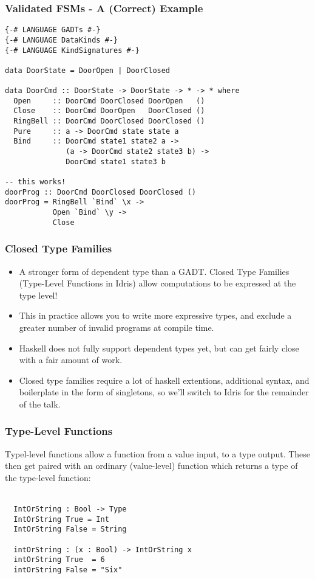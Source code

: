 \documentclass{beamer}
\begin{document}
\begin{frame}[fragile, shrink=10]
\frametitle{Validated FSMs - A (Correct) Example}
\begin{verbatim}
{-# LANGUAGE GADTs #-}
{-# LANGUAGE DataKinds #-}
{-# LANGUAGE KindSignatures #-}

data DoorState = DoorOpen | DoorClosed

data DoorCmd :: DoorState -> DoorState -> * -> * where
  Open     :: DoorCmd DoorClosed DoorOpen   ()  
  Close    :: DoorCmd DoorOpen   DoorClosed ()
  RingBell :: DoorCmd DoorClosed DoorClosed ()
  Pure     :: a -> DoorCmd state state a
  Bind     :: DoorCmd state1 state2 a -> 
              (a -> DoorCmd state2 state3 b) ->
              DoorCmd state1 state3 b

-- this works!
doorProg :: DoorCmd DoorClosed DoorClosed ()
doorProg = RingBell `Bind` \x ->  
           Open `Bind` \y -> 
           Close
\end{verbatim}
\end{frame}

\begin{frame}[fragile]
\frametitle{Closed Type Families}
  \begin{itemize}
    \item A stronger form of dependent type than a GADT. Closed Type Families
      (Type-Level Functions in Idris) allow computations to be expressed at 
      the type level!
    \item This in practice allows you to write more expressive types, and
      exclude a greater number of invalid programs at compile time.
    \item Haskell does not fully support dependent types yet, but can get
      fairly close with a fair amount of work.
    \item Closed type families require a lot of haskell extentions, additional
      syntax, and boilerplate in the form of singletons, so we'll switch to
      Idris for the remainder of the talk.
  \end{itemize} 
\end{frame}

\begin{frame}[fragile]
\frametitle{Type-Level Functions}
Typel-level functions allow a function from a value input, to a type output.
These then get paired with an ordinary (value-level) function which returns a
type of the type-level function: \\ \\
\begin{minipage}{1\textwidth}
\begin{verbatim}
  IntOrString : Bool -> Type
  IntOrString True = Int
  IntOrString False = String

  intOrString : (x : Bool) -> IntOrString x
  intOrString True  = 6
  intOrString False = "Six"
\end{verbatim}
\end{minipage}
\end{frame}
\end{document}
